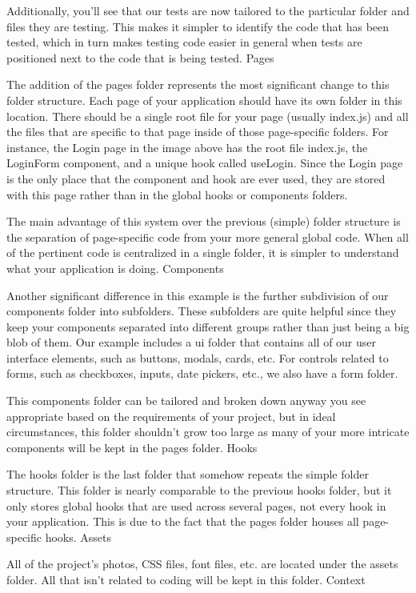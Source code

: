 Additionally, you'll see that our tests are now tailored to the particular folder and files they are testing. This makes it simpler to identify the code that has been tested, which in turn makes testing code easier in general when tests are positioned next to the code that is being tested.
Pages

The addition of the pages folder represents the most significant change to this folder structure. Each page of your application should have its own folder in this location. There should be a single root file for your page (usually index.js) and all the files that are specific to that page inside of those page-specific folders. For instance, the Login page in the image above has the root file index.js, the LoginForm component, and a unique hook called useLogin. Since the Login page is the only place that the component and hook are ever used, they are stored with this page rather than in the global hooks or components folders.

The main advantage of this system over the previous (simple) folder structure is the separation of page-specific code from your more general global code. When all of the pertinent code is centralized in a single folder, it is simpler to understand what your application is doing.
Components

Another significant difference in this example is the further subdivision of our components folder into subfolders. These subfolders are quite helpful since they keep your components separated into different groups rather than just being a big blob of them. Our example includes a ui folder that contains all of our user interface elements, such as buttons, modals, cards, etc. For controls related to forms, such as checkboxes, inputs, date pickers, etc., we also have a form folder.

This components folder can be tailored and broken down anyway you see appropriate based on the requirements of your project, but in ideal circumstances, this folder shouldn't grow too large as many of your more intricate components will be kept in the pages folder.
Hooks

The hooks folder is the last folder that somehow repeats the simple folder structure. This folder is nearly comparable to the previous hooks folder, but it only stores global hooks that are used across several pages, not every hook in your application. This is due to the fact that the pages folder houses all page-specific hooks.
Assets

All of the project's photos, CSS files, font files, etc. are located under the assets folder. All that isn't related to coding will be kept in this folder.
Context

